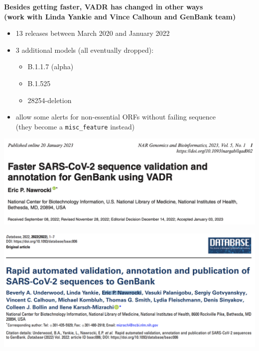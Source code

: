 \documentclass[landscape]{slides}
\begin{document}
\begin{slide}
\begin{center}
\textbf{Besides getting faster, VADR has changed in other ways \\ (work with Linda Yankie and Vince Calhoun and GenBank team)}

\begin{itemize}
\item 13 releases between March 2020 and January 2022
\item 3 additional models (all eventually dropped):
  \begin{itemize}
  \item B.1.1.7 (alpha)
  \item B.1.525
  \item 28254-deletion
  \end{itemize}
\item allow some alerts for non-essential ORFs without failing sequence \\ (they become a \texttt{misc\_feature} instead)
\end{itemize}

\end{center}

\vfill
\end{slide}
\begin{slide}
  \begin{center}
\includegraphics[width=10.5in]{figs/vadr-sarscov2-paper}
\end{center}

\vfill
\end{slide}
\begin{slide}
  \begin{center}
\includegraphics[width=10.5in]{figs/paper-genbank-covid}
\end{center}

\vfill
\end{slide}
\end{document}
